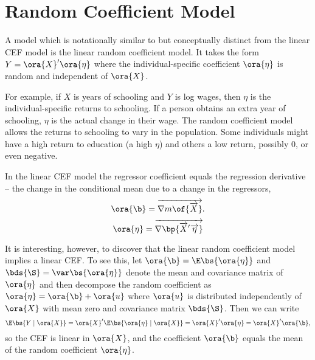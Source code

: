

\setcounter{section}{28}

\section{Random Coefficient Model}

A model which is notationally similar to but conceptually distinct from the linear CEF model is the linear random coefficient model. It takes the form $Y = \ora{X}^{\prime} \ora{\eta}$ where the individual-specific coefficient $\ora{\eta}$ is random and independent of $\ora{X}$. 

For example, if $X$ is years of schooling and $Y$ is log wages, then $\eta$ is the individual-specific returns to schooling. If a person obtains an extra year of schooling, $\eta$ is the actual change in their wage. The random coefficient model allows the returns to schooling to vary in the population. Some individuals might have a high return to education (a high $\eta$) and others a low return, possibly $0$, or even negative.

In the linear CEF model the regressor coefficient equals the regression derivative -- the change in the conditional mean due to a change in the regressors, 
$$\ora{\b} = \overrightarrow{\nabla m\of{\overrightarrow{X}}}.$$ 
 
$$\ora{\eta} = \overrightarrow{\nabla \bp{\overrightarrow{X}^{\prime} \overrightarrow{\eta}}}$$

It is interesting, however, to discover that the linear random coefficient model implies a linear CEF. To see this, let $\ora{\b} = \E\bs{\ora{\eta}}$ and $\bds{\S} = \var\bs{\ora{\eta}}$ denote the mean and covariance matrix of $\ora{\eta}$ and then decompose the random coefficient as $\ora{\eta} = \ora{\b} + \ora{u}$ where $\ora{u}$ is distributed independently of $\ora{X}$ with mean zero and covariance matrix $\bds{\S}$. Then we can write
\begin{equation}
    \notag 
    \E\bs{Y \mid \ora{X}} = \ora{X}^{\prime} \E\bs{\ora{\eta} \mid \ora{X}} = \ora{X}^{\prime} \ora{\eta} = \ora{X}^{\prime} \ora{\b},
\end{equation}
so the CEF is linear in $\ora{X}$, and the coefficient $\ora{\b}$ equals the mean of the random coefficient $\ora{\eta}$. 

